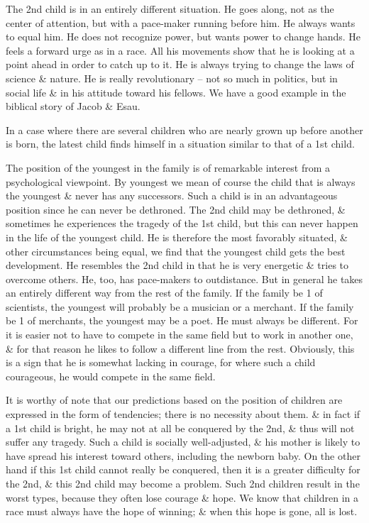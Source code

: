 \documentclass{article}
\begin{document}
The 2nd child is in an entirely different situation. He goes along, not as the center of attention, but with a pace-maker running before him. He always wants to equal him. He does not recognize power, but wants power to change hands. He feels a forward urge as in a race. All his movements show that he is looking at a point ahead in order to catch up to it. He is always trying to change the laws of science \& nature. He is really revolutionary -- not so much in politics, but in social life \& in his attitude toward his fellows. We have a good example in the biblical story of Jacob \& Esau.

In a case where there are several children who are nearly grown up before another is born, the latest child finds himself in a situation similar to that of a 1st child.

The position of the youngest in the family is of remarkable interest from a psychological viewpoint. By youngest we mean of course the child that is always the youngest \& never has any successors. Such a child is in an advantageous position since he can never be dethroned. The 2nd child may be dethroned, \& sometimes he experiences the tragedy of the 1st child, but this can never happen in the life of the youngest child. He is therefore the most favorably situated, \& other circumstances being equal, we find that the youngest child gets the best development. He resembles the 2nd child in that he is very energetic \& tries to overcome others. He, too, has pace-makers to outdistance. But in general he takes an entirely different way from the rest of the family. If the family be 1 of scientists, the youngest will probably be a musician or a merchant. If the family be 1 of merchants, the youngest may be a poet. He must always be different. For it is easier not to have to compete in the same field but to work in another one, \& for that reason he likes to follow a different line from the rest. Obviously, this is a sign that he is somewhat lacking in courage, for where such a child courageous, he would compete in the same field.

It is worthy of note that our predictions based on the position of children are expressed in the form of tendencies; there is no necessity about them. \& in fact if a 1st child is bright, he may not at all be conquered by the 2nd, \& thus will not suffer any tragedy. Such a child is socially well-adjusted, \& his mother is likely to have spread his interest toward others, including the newborn baby. On the other hand if this 1st child cannot really be conquered, then it is a greater difficulty for the 2nd, \& this 2nd child may become a problem. Such 2nd children result in the worst types, because they often lose courage \& hope. We know that children in a race must always have the hope of winning; \& when this hope is gone, all is lost.
\end{document}
